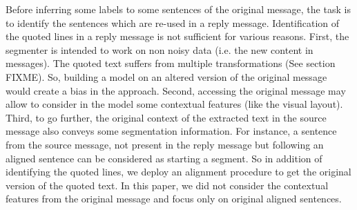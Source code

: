 






Before inferring some labels to some sentences of the original message, the task is to identify the sentences which are re-used in a reply message. 
Identification of the quoted lines in a reply message is not sufficient for various reasons. 
%
First, the segmenter is intended to work on non noisy data (i.e. the new content in messages). 
The quoted text suffers from multiple transformations (See section FIXME).  
So, building a model on an altered version of the original message would create a bias in the approach.
Second, accessing the original message may allow to consider in the model some contextual features (like the visual layout). 
Third, to go further, the original context of the extracted text in the source message also conveys some segmentation information. For instance, a sentence from the source message, not present in the reply message but following an aligned sentence can be considered as starting a segment.
So in addition of identifying the quoted lines, we deploy an alignment procedure to get the original version of the quoted text. 
In this paper, we did not consider the contextual features from the original message and focus only on original aligned sentences. 





